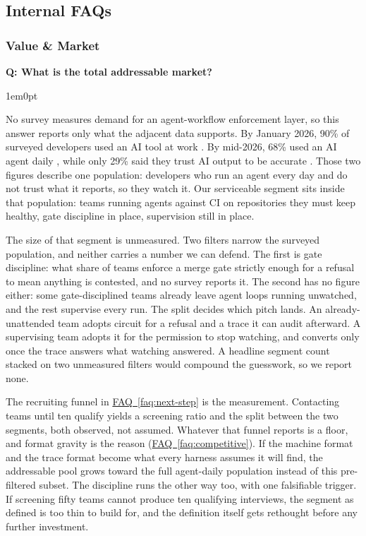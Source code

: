 \documentclass[11pt,letterpaper]{article}
\newcounter{faqnum}
\newenvironment{faqpair}[1]{%
  \needspace{4\baselineskip}%
  \vspace{0.5em}%
  \refstepcounter{faqnum}%
  \noindent\textbf{\color{SectionBlue}Q\thefaqnum: #1}\par\nopagebreak[4]%
  \vspace{0.2em}%
  \begin{adjustwidth}{1em}{0pt}%
  \setlength{\parindent}{0pt}%
}{%
  \end{adjustwidth}%
  \vspace{0.5em}%
}
\newcommand{\faqref}[1]{\hyperref[#1]{FAQ~\ref*{#1}}}
\begin{document}

\newpage
\subsection*{Internal FAQs}

\subsubsection*{Value \& Market}

\begin{faqpair}{What is the total addressable market?}
\label{faq:tam}
  No survey measures demand for an agent-workflow enforcement layer, so this answer reports only what the adjacent data supports. By January 2026, 90\% of surveyed developers used an AI tool at work \cite{jetbrains2026aiadoption}. By mid-2026, 68\% used an AI agent daily \cite{jetbrains2026agenttrends}, while only 29\% said they trust AI output to be accurate \cite{stackoverflow2025survey}. Those two figures describe one population: developers who run an agent every day and do not trust what it reports, so they watch it. Our serviceable segment sits inside that population: teams running agents against CI on repositories they must keep healthy, gate discipline in place, supervision still in place.

  The size of that segment is unmeasured. Two filters narrow the surveyed population, and neither carries a number we can defend. The first is gate discipline: what share of teams enforce a merge gate strictly enough for a refusal to mean anything is contested, and no survey reports it. The second has no figure either: some gate-disciplined teams already leave agent loops running unwatched, and the rest supervise every run. The split decides which pitch lands. An already-unattended team adopts circuit for a refusal and a trace it can audit afterward. A supervising team adopts it for the permission to stop watching, and converts only once the trace answers what watching answered. A headline segment count stacked on two unmeasured filters would compound the guesswork, so we report none.

  The recruiting funnel in \faqref{faq:next-step} is the measurement. Contacting teams until ten qualify yields a screening ratio and the split between the two segments, both observed, not assumed. Whatever that funnel reports is a floor, and format gravity is the reason (\faqref{faq:competitive}). If the machine format and the trace format become what every harness assumes it will find, the addressable pool grows toward the full agent-daily population instead of this pre-filtered subset. The discipline runs the other way too, with one falsifiable trigger. If screening fifty teams cannot produce ten qualifying interviews, the segment as defined is too thin to build for, and the definition itself gets rethought before any further investment.
\end{faqpair}
\end{document}
